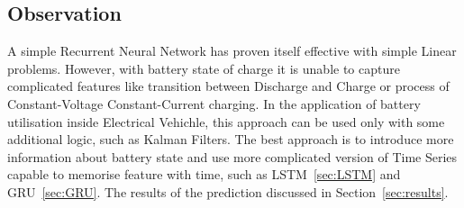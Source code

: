 \subsection{Observation}
    A simple Recurrent Neural Network has proven itself effective with simple Linear problems. However, with battery state of charge it is unable to capture complicated features like transition between Discharge and Charge or process of Constant-Voltage Constant-Current charging. In the application of battery utilisation inside Electrical Vehichle, this approach can be used only with some additional logic, such as Kalman Filters.
    The best approach is to introduce more information about battery state and use more complicated version of Time Series capable to memorise feature with time, such as LSTM~\ref{sec:LSTM} and GRU~\ref{sec:GRU}.
    The results of the prediction discussed in Section~\ref{sec:results}.
    